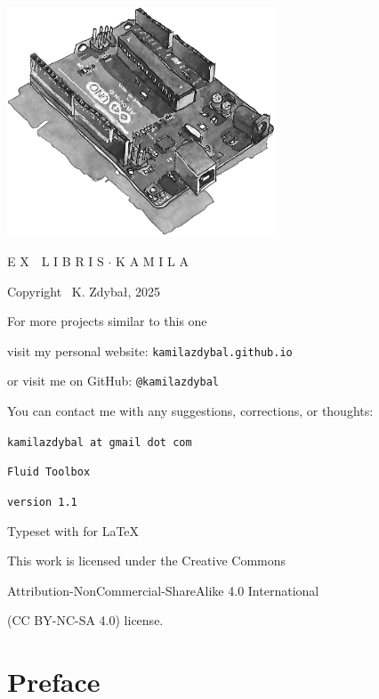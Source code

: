 \documentclass[12pt]{report}
\begin{document}
\thispagestyle{empty}
\begin{center}
\vspace*{3cm}
\includegraphics[width = 80mm]{ex_libris_arduino.jpg}

\vspace*{1cm}

{\fontsize{18}{10}\selectfont {}\selectfont E X \,\, L I B R I S $\cdotp$ K A M I L A}

\vspace*{2cm}

Copyright \textcopyright \, K. Zdybał, 2025

For more projects similar to this one

visit my personal website: \verb|kamilazdybal.github.io|

or visit me on GitHub: \verb|@kamilazdybal|

You can contact me with any suggestions, corrections, or thoughts:

\verb|kamilazdybal at gmail dot com|

\vspace*{2cm}

\verb|Fluid Toolbox|

\verb|version 1.1|

Typeset with  for \LaTeX

\vspace*{1.8cm}

\noindent This work is licensed under the Creative Commons

Attribution-NonCommercial-ShareAlike 4.0 International 

(CC BY-NC-SA
4.0) license.
\end{center}

\setlength{\parskip}{0.6em}
\setlength{\parindent}{0cm}



\chapter*{Preface}
\thispagestyle{empty}
\end{document}

